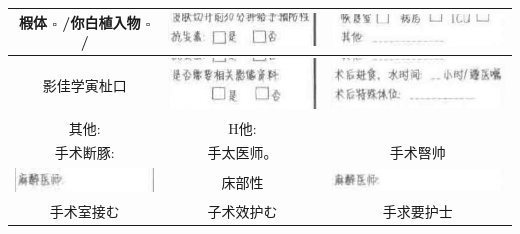 \documentclass[10pt]{article}
\begin{document}
\begin{center}
\begin{tabular}{|c|c|c|}
\hline
椵体 $\square$ /你白植入物 $\square$ / & \includegraphics[max width=\textwidth]{2024_07_05_645bb794a4d4f32ee0c8g-080}
 & \includegraphics[max width=\textwidth]{2024_07_05_645bb794a4d4f32ee0c8g-080(29)}
 \\
\hline
影佳学寅杫口 & \includegraphics[max width=\textwidth]{2024_07_05_645bb794a4d4f32ee0c8g-080(35)}
 & \includegraphics[max width=\textwidth]{2024_07_05_645bb794a4d4f32ee0c8g-080(28)}
 \\
\hline
其他: & H他: &  \\
\hline
手术断豚: & 手太医师。 & 手术㗨帅 \\
\hline
\includegraphics[max width=\textwidth]{2024_07_05_645bb794a4d4f32ee0c8g-080(33)}
 & 床部性 & \includegraphics[max width=\textwidth]{2024_07_05_645bb794a4d4f32ee0c8g-080(25)}
 \\
\hline
手术室接む & 子术效护む & 手求要护士 \\
\hline
\end{tabular}
\end{center}
\end{document}
